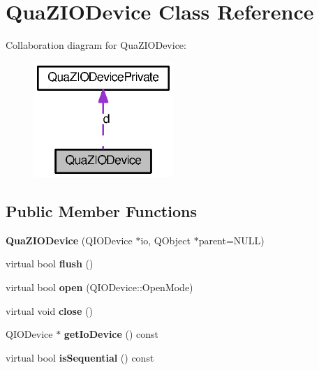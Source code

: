 \section{QuaZIODevice Class Reference}
\label{classQuaZIODevice}


Collaboration diagram for QuaZIODevice:
\nopagebreak
\begin{figure}[H]
\begin{center}
\leavevmode
\includegraphics[width=150pt]{classQuaZIODevice__coll__graph}
\end{center}
\end{figure}
\subsection*{Public Member Functions}
\begin{DoxyCompactItemize}
\item 
{\bfseries QuaZIODevice} (QIODevice $\ast$io, QObject $\ast$parent=NULL)\label{classQuaZIODevice_a8321ed35ee9b57cf9b1104912e236361}

\item 
virtual bool {\bfseries flush} ()\label{classQuaZIODevice_a25f586eb564841b51c395fd17f1cc080}

\item 
virtual bool {\bfseries open} (QIODevice::OpenMode)\label{classQuaZIODevice_af0bc63e1ba015a502633b1a854461362}

\item 
virtual void {\bfseries close} ()\label{classQuaZIODevice_ad27e447544d57f897316ee6f44535895}

\item 
QIODevice $\ast$ {\bfseries getIoDevice} () const \label{classQuaZIODevice_ad63e7f1717c7d91b3c2c5ace908c98b7}

\item 
virtual bool {\bfseries isSequential} () const \label{classQuaZIODevice_af2697f58c228741d3715801bf48a9a8b}

\end{DoxyCompactItemize}
